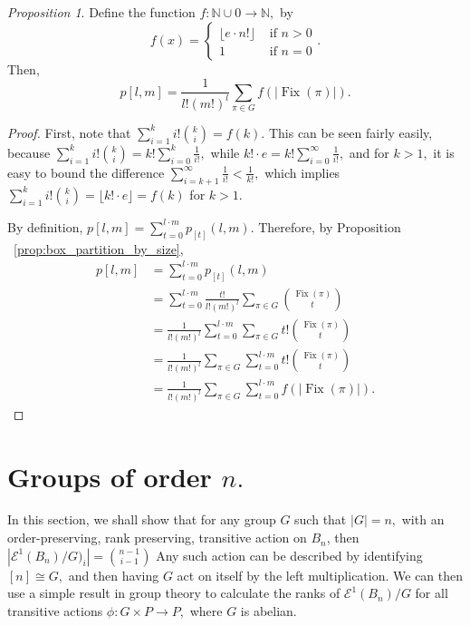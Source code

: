 \documentclass[10 pt]{amsart}
\theoremstyle{plain}
\theoremstyle{definition}
\theoremstyle{remark}
\numberwithin{equation}{section}
\newtheorem{prop}[thm]{Proposition}
\theoremstyle{remark}
\newcommand\BN{{\mathbb N}}
\def\Fix{\operatorname{Fix}}
\begin{document}
\begin{prop}
\label{prop:all_box_partitions}
Define the function $f:\BN \cup 0 \rightarrow \BN,$ by $$f(x) = \begin{cases} \lfloor e\cdot n!\rfloor &\text{ if } n > 0 \\ 1 &\text{ if } n = 0\end{cases}.$$
Then, $$p[l,m] = \frac 1 {l!(m!)^l}\sum_{\pi \in G} f(|\Fix(\pi)|).$$
\end{prop}
\begin{proof}
First, note that $\sum_{i=1}^k i! \binom k i = f(k).$ This can be seen fairly easily, because $\sum_{i=1}^k i! \binom k i = k!\sum_{i=0}^k \frac 1 {i!},$ while $k! \cdot e = k!\sum_{i=0}^\infty \frac 1 {i!},$ and for $k > 1,$ it is easy to bound the difference $\sum_{i=k+1}^\infty \frac 1 {i!} < \frac 1 {k!},$ which implies   $\sum_{i=1}^k i! \binom k i  = \lfloor k! \cdot e \rfloor = f(k)$ for $k > 1.$

By definition, $p[l,m] = \sum_{t = 0}^{l\cdot m} p_{[t]}(l,m)$. Therefore, by Proposition ~\ref{prop:box_partition_by_size},
\begin{align*}
p[l,m] &= \sum_{t = 0}^{l\cdot m} p_{[t]}(l,m)\\
&=\sum_{t = 0}^{l\cdot m}\frac {t!}{l!(m!)^l}\sum_{\pi \in G} \binom {\Fix(\pi)} t\\
&= \frac {1}{l!(m!)^l}\sum_{t = 0}^{l\cdot m}\sum_{\pi \in G} t!\binom {\Fix(\pi)} t\\
&=  \frac {1}{l!(m!)^l}\sum_{\pi \in G}\sum_{t = 0}^{l\cdot m} t!\binom {\Fix(\pi)} t\\
&= \frac {1}{l!(m!)^l}\sum_{\pi \in G}\sum_{t = 0}^{l\cdot m} f(|\Fix(\pi)|).
\end{align*}
\end{proof}

\section{Groups of order $n.$}

In this section, we shall show that for any group $G$ such that $|G| = n,$ with an order-preserving, rank preserving, transitive action on $B_n$, then $|\mathcal E^1(B_n)/G)_i| = \binom {n-1}{i-1}$ Any such action can be described by identifying $[n] \cong G,$ and then having $G$ act on itself by the left multiplication. We can then use a simple result in group theory to calculate the ranks of $\mathcal E^1(B_n)/G$ for all transitive actions $\phi:G\times P \rightarrow P,$ where $G$ is abelian.
\end{document}

